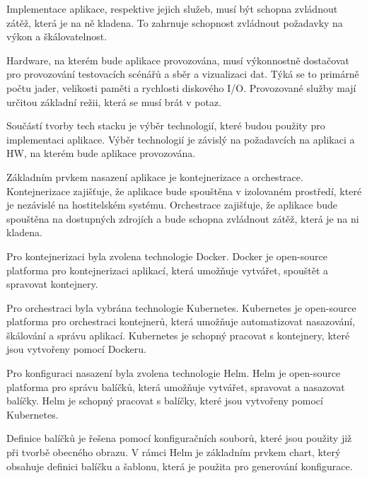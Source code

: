 

Implementace aplikace, respektive jejich služeb, musí být schopna zvládnout zátěž, která je na ně kladena. To zahrnuje schopnost zvládnout požadavky na výkon a škálovatelnost.


Hardware, na kterém bude aplikace provozována, musí výkonnostně dostačovat pro provozování testovacích scénářů a sběr a vizualizaci dat. Týká se to primárně počtu jader, velikosti paměti a rychlosti diskového I/O. Provozované služby mají určitou základní režii, která se musí brát v potaz.


Součástí tvorby tech stacku je výběr technologií, které budou použity pro implementaci aplikace. Výběr technologií je závislý na požadavcích na aplikaci a HW, na kterém bude aplikace provozována.


Základním prvkem nasazení aplikace je kontejnerizace a orchestrace. Kontejnerizace zajišťuje, že aplikace bude spouštěna v izolovaném prostředí, které je nezávislé na hostitelském systému. Orchestrace zajišťuje, že aplikace bude spouštěna na dostupných zdrojích a bude schopna zvládnout zátěž, která je na ni kladena.

Pro kontejnerizaci byla zvolena technologie Docker. Docker je open-source platforma pro kontejnerizaci aplikací, která umožňuje vytvářet, spouštět a spravovat kontejnery.

Pro orchestraci byla vybrána technologie Kubernetes. Kubernetes je open-source platforma pro orchestraci kontejnerů, která umožňuje automatizovat nasazování, škálování a správu aplikací. Kubernetes je schopný pracovat s kontejnery, které jsou vytvořeny pomocí Dockeru.


Pro konfiguraci nasazení byla zvolena technologie Helm. Helm je open-source platforma pro správu balíčků, která umožňuje vytvářet, spravovat a nasazovat balíčky. Helm je schopný pracovat s balíčky, které jsou vytvořeny pomocí Kubernetes.

Definice balíčků je řešena pomocí konfiguračních souborů, které jsou použity již při tvorbě obecného obrazu. V rámci Helm je základním prvkem chart, který obsahuje definici balíčku a šablonu, která je použita pro generování konfigurace.

